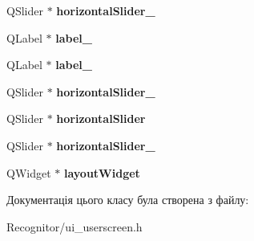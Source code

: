 \begin{DoxyCompactItemize}
\item 
\hypertarget{classUi__UserScreen_a57a36cf6e2388927e7acdaa43ace19b2}{Q\-Slider $\ast$ {\bfseries horizontal\-Slider\-\_}}\label{classUi__UserScreen_a57a36cf6e2388927e7acdaa43ace19b2}

\item 
\hypertarget{classUi__UserScreen_aad1f88c242894492830b58ea3f3d783a}{Q\-Label $\ast$ {\bfseries label\-\_}}\label{classUi__UserScreen_aad1f88c242894492830b58ea3f3d783a}

\item 
\hypertarget{classUi__UserScreen_a2660cf76b6c5d53244b990e0ad76e7f4}{Q\-Label $\ast$ {\bfseries label\-\_}}\label{classUi__UserScreen_a2660cf76b6c5d53244b990e0ad76e7f4}

\item 
\hypertarget{classUi__UserScreen_aa8a10f18cb899db1a6a8b30efd2ecdca}{Q\-Slider $\ast$ {\bfseries horizontal\-Slider\-\_}}\label{classUi__UserScreen_aa8a10f18cb899db1a6a8b30efd2ecdca}

\item 
\hypertarget{classUi__UserScreen_afd05cb4039d10a19d4b33db410a18698}{Q\-Slider $\ast$ {\bfseries horizontal\-Slider}}\label{classUi__UserScreen_afd05cb4039d10a19d4b33db410a18698}

\item 
\hypertarget{classUi__UserScreen_a58ee9b1ba684a8c83c1e1e3e86954cf2}{Q\-Slider $\ast$ {\bfseries horizontal\-Slider\-\_}}\label{classUi__UserScreen_a58ee9b1ba684a8c83c1e1e3e86954cf2}

\item 
\hypertarget{classUi__UserScreen_a93f91b432f75a6cf25fa35e8bb4d64d3}{Q\-Widget $\ast$ {\bfseries layout\-Widget}}\label{classUi__UserScreen_a93f91b432f75a6cf25fa35e8bb4d64d3}

\end{DoxyCompactItemize}


Документація цього класу була створена з файлу\-:\begin{DoxyCompactItemize}
\item 
Recognitor/ui\-\_\-userscreen.\-h\end{DoxyCompactItemize}
